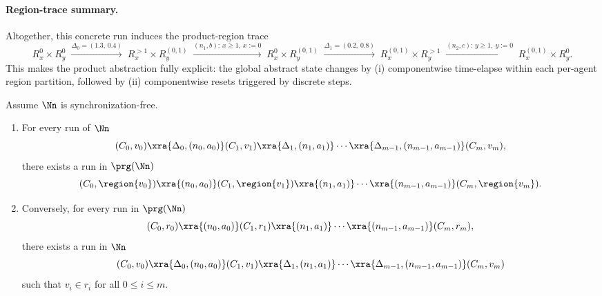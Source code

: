 \paragraph{Region-trace summary.}
Altogether, this concrete run induces the product-region trace
\[
R_x^0\times R_y^0
\;\xrightarrow{\Delta_0=(1.3,\,0.4)}\;
R_x^{>1}\times R_y^{(0,1)}
\;\xrightarrow{(n_1,b):\,x\ge 1,\ x:=0}\;
R_x^{0}\times R_y^{(0,1)}
\;\xrightarrow{\Delta_1=(0.2,\,0.8)}\;
R_x^{(0,1)}\times R_y^{>1}
\;\xrightarrow{(n_2,c):\,y\ge 1,\ y:=0}\;
R_x^{(0,1)}\times R_y^{0}.
\]
This makes the product abstraction fully explicit: the global abstract state
changes by (i) componentwise time-elapse within each per-agent region partition,
followed by (ii) componentwise resets triggered by discrete steps.

\begin{lemma}
\label{lem:reg-prod-reg-equiv}
Assume $\Nn$ is synchronization-free.
\begin{enumerate}
  \item For every run of $\Nn$
  \[
  (C_0,v_0)\xra{\Delta_0,(n_0,a_0)}(C_1,v_1)\xra{\Delta_1,(n_1,a_1)}\cdots\xra{\Delta_{m-1},(n_{m-1},a_{m-1})}(C_m,v_m),
  \]
  there exists a run in $\prg(\Nn)$
  \[
  (C_0,\region{v_0})\xra{(n_0,a_0)}(C_1,\region{v_1})\xra{(n_1,a_1)}\cdots\xra{(n_{m-1},a_{m-1})}(C_m,\region{v_m}).
  \]
  \item Conversely, for every run in $\prg(\Nn)$
  \[
  (C_0,r_0)\xra{(n_0,a_0)}(C_1,r_1)\xra{(n_1,a_1)}\cdots\xra{(n_{m-1},a_{m-1})}(C_m,r_m),
  \]
  there exists a run in $\Nn$
  \[
  (C_0,v_0)\xra{\Delta_0,(n_0,a_0)}(C_1,v_1)\xra{\Delta_1,(n_1,a_1)}\cdots\xra{\Delta_{m-1},(n_{m-1},a_{m-1})}(C_m,v_m)
  \]
  such that $v_i\in r_i$ for all $0\le i\le m$.
\end{enumerate}
\end{lemma}

